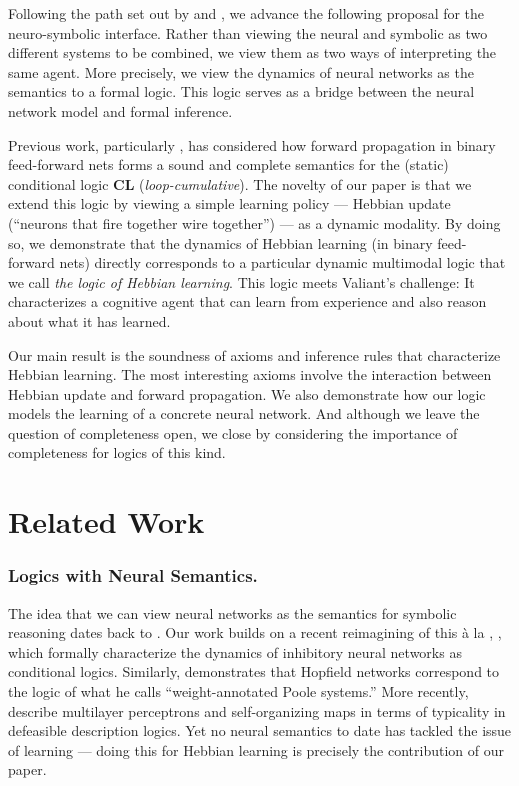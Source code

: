 \documentclass[letterpaper]{article}
\theoremstyle{definition}
\begin{document}
Following the path set out by \cite{balkenius1991nonmonotonic} and \cite{leitgeb2001nonmonotonic,leitgeb2003nonmonotonic}, we advance the following proposal for the neuro-symbolic interface.  Rather than viewing the neural and symbolic as two different systems to be combined, we view them as two ways of interpreting the same agent.  More precisely, we view the dynamics of neural networks as the semantics to a formal logic.  This logic serves as a bridge between the neural network model and formal inference.

Previous work, particularly \cite{leitgeb2001nonmonotonic}, has considered how forward propagation in binary feed-forward nets forms a sound and complete semantics for the (static) conditional logic \textbf{CL} (\emph{loop-cumulative}).  The novelty of our paper is that we extend this logic by viewing a simple learning policy --- Hebbian update (``neurons that fire together wire together'') --- as a dynamic modality.  By doing so, we demonstrate that the dynamics of Hebbian learning (in binary feed-forward nets) directly corresponds to a particular dynamic multimodal logic that we call \emph{the logic of Hebbian learning}.
This logic meets Valiant's challenge:  It characterizes a cognitive agent that can learn from experience and also reason about what it has learned.

Our main result is the soundness of axioms and inference rules that characterize Hebbian learning.  The most interesting axioms involve the interaction between Hebbian update and forward propagation.  We also demonstrate how our logic models the learning of a concrete neural network. And although we leave the question of completeness open, we close by considering the importance of completeness for logics of this kind.

\section{Related Work}

\subsubsection{Logics with Neural Semantics.}
The idea that we can view neural networks as the semantics for symbolic reasoning dates back to \cite{mcculloch1943logical}.  Our work builds on a recent reimagining of this \`a la \cite{balkenius1991nonmonotonic}, \cite{leitgeb2001nonmonotonic,leitgeb2003nonmonotonic,leitgeb2018neural}, which formally characterize the dynamics of inhibitory neural networks as conditional logics.  Similarly, \cite{blutner2004nonmonotonic} demonstrates that Hopfield networks correspond to the logic of what he calls ``weight-annotated Poole systems.''  More recently, \cite{giordano2021} describe multilayer perceptrons and self-organizing maps in terms of typicality in defeasible description logics.  Yet no neural semantics to date has tackled the issue of learning --- doing this for Hebbian learning is precisely the contribution of our paper.
\end{document}
